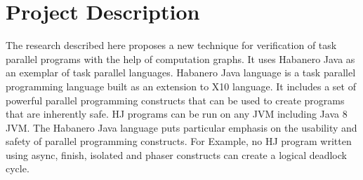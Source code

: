 \section{Project Description}
The research described here proposes a new technique for verification of task parallel programs with the help of computation graphs. It uses Habanero Java as an exemplar of task parallel languages. Habanero Java language is a task parallel programming language built as an extension to X10 language. It includes a set of powerful parallel programming constructs that can be used to create programs that are inherently safe. HJ programs can be run on any JVM including Java 8 JVM.  The Habanero Java language puts particular emphasis on the usability and safety of parallel programming constructs. For Example, no HJ program written using async, finish, isolated and phaser constructs can create a logical deadlock cycle.

